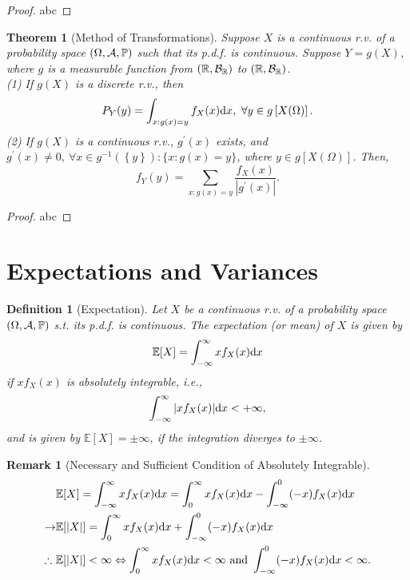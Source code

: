 \documentclass[openany,12pt]{book}
\newtheorem{theorem}{Theorem}[chapter]
\newtheorem{remark}{Remark}[chapter]
\newtheorem{definition}{Definition}[chapter]
\begin{document}
\begin{proof}
  abc
\end{proof}

\begin{theorem}[Method of Transformations]
Suppose $X$ is a continuous r.v. of a probability space $(\Omega,\mathcal{A},\mathbb{P})$ such that its p.d.f. is continuous. Suppose $Y=g(X)$, where $g$ is a measurable function from $(\mathbb{R},\mathcal{B}_\mathbb{R})$ to $(\mathbb{R},\mathcal{B}_\mathbb{R})$.\\
(1) If $g(X)$ is a discrete r.v., then
$$
P_Y(y)=\int_{x:g(x)=y}{f_X(x)\mathrm{d} x},\ \forall y\in g\left[X(\Omega)\right].
$$
(2) If $g(X)$ is a continuous r.v., $g^\prime(x)$ exists, and $g^\prime(x)\neq0,\ \forall x\in g^{-1}\left(\left\{y\right\}\right):\{x:g(x)=y\}$, where $y\in g\left[X(\Omega)\right]$. Then,
$$
f_Y(y)=\sum_{x:g(x)=y}\frac{f_X(x)}{|g^\prime(x)|}.
$$
\end{theorem}

\begin{proof}
  abc
\end{proof}

\section{Expectations and Variances}

\begin{definition}[Expectation]
Let $X$ be a continuous r.v. of a probability space $(\Omega,\mathcal{A},\mathbb{P})$ s.t. its p.d.f. is continuous. The expectation (or mean) of $X$ is given by
$$
\mathbb{E}[X]=\int_{-\infty}^{\infty}xf_X(x)\mathrm{d} x
$$
if $xf_X(x)$ is absolutely integrable, i.e.,
$$
\int_{-\infty}^{\infty}{|xf_X(x)|\mathrm{d} x}<+\infty,
$$
and is given by $\mathbb{E}[X]=\pm\infty$, if the integration diverges to $\pm\infty$.
\end{definition}

\begin{remark}[Necessary and Sufficient Condition of Absolutely Integrable]
$$\begin{aligned}
&\mathbb{E}[X]=\int_{-\infty}^{\infty}xf_X(x)\mathrm{d} x=\int_{0}^{\infty}xf_X(x)\mathrm{d} x-\int_{-\infty}^{0}(-x)f_X(x)\mathrm{d} x\\
\to &\mathbb{E}[|X|]=\int_{0}^{\infty}xf_X(x)\mathrm{d} x+\int_{-\infty}^{0}(-x)f_X(x)\mathrm{d} x\\
\therefore\ &\mathbb{E}[|X|]<\infty\Leftrightarrow \int_{0}^{\infty}xf_X(x)\mathrm{d} x<\infty  \text{ and } \int_{-\infty}^{0}(-x)f_X(x)\mathrm{d} x<\infty.
\end{aligned}$$
\end{remark}
\end{document}
